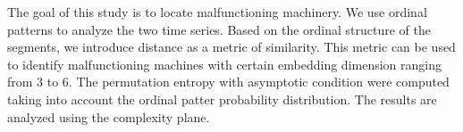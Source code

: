 The goal of this study is to locate malfunctioning machinery. We use ordinal patterns to analyze the two time series. Based on the ordinal structure of the segments, we introduce distance as a metric of similarity. This metric can be used to identify malfunctioning machines with certain embedding dimension ranging from 3 to 6. The permutation entropy with asymptotic condition were computed taking into account the ordinal patter probability distribution. The results are analyzed using the complexity plane. 



